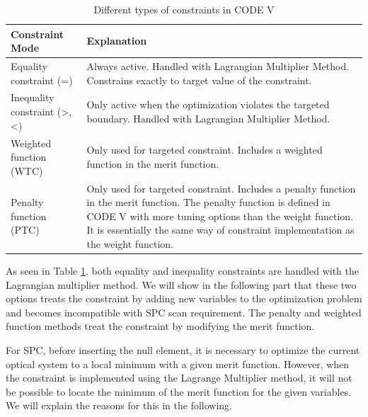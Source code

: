 \begin{table}[h!]
    \centering
    \captionsetup{justification=centering}
    \caption{Different types of constraints in CODE V\cite{codevmanual}}
    \label{table: codevconstraints}
    \vspace{-1em}
    \begin{tabular}{ p{} | m{} }
    \hline 
    \textbf{Constraint Mode} & \textbf{Explanation}\\
    \hline
    Equality constraint (=) & Always active. Handled with Lagrangian Multiplier Method. Constrains exactly to target value of the constraint.  \\
    \hline
    Inequality constraint (>, <) & Only active when the optimization violates the targeted boundary. Handled with Lagrangian Multiplier Method.\\
    \hline
    Weighted function (WTC) & Only used for targeted constraint. Includes a weighted function in the merit function.\\
    \hline
    Penalty function (PTC) & Only used for targeted constraint. Includes a penalty function in the merit function. The penalty function is defined in CODE V with more tuning options than the weight function. It is essentially the same way of constraint implementation as the weight function.\\
    \hline
    \end{tabular}
\end{table}

As seen in Table \ref{table: codevconstraints}, both equality and inequality constraints are handled with the Lagrangian multiplier method. We will show in the following part that these two options treats the constraint by adding new variables to the optimization problem and becomes incompatible with SPC scan requirement. The penalty and weighted function methods treat the constraint by modifying the merit function. 

For SPC, before inserting the null element, it is necessary to optimize the current optical system to a local minimum with a given merit function. However, when the constraint is implemented using the Lagrange Multiplier method, it will not be possible to locate the minimum of the merit function for the given variables. We will explain the reasons for this in the following. 

